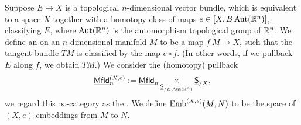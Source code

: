\documentclass[twoside]{article}
\begin{document}
\begin{definition}
    Suppose $E\to X$ is a topological $n$-dimensional vector bundle, which is 
    equivalent to a space $X$ together with a homotopy class of maps
    $e\in[X,B\operatorname{Aut}(\mathbb{R}^n)]$, classifying $E$, where $\operatorname{Aut}(\mathbb{R}^n)$ is the
    automorphism topological group of $\mathbb{R}^n$. We define an 
    on an $n$-dimensional manifold $M$ to be a map $f\:M\to X$, such that
    the tangent bundle $TM$ is classified by the map $e\circ f$.
    (In other words, if we pullback $E$ along $f$, we obtain $TM$.)
    We consider the (homotopy) pullback \[\underline{\smash{\mathsf{Mfld}}}_n^{(X,e)}:=\underline{\smash{\mathsf{Mfld}}}_n
    \mathop{\operatorname{\times}}\limits_{\underline{\smash{\mathsf{S}}}_{/B\operatorname{Aut}(\mathbb{R}^n)}}\underline{\smash{\mathsf{S}}}_{/X},\]
    we regard this $\infty$-category as the . We define
    $\operatorname{Emb}^{(X,e)}(M,N)$ to be the space of $(X,e)$-embeddings from $M$ to $N$.
\end{definition}
\end{document}
